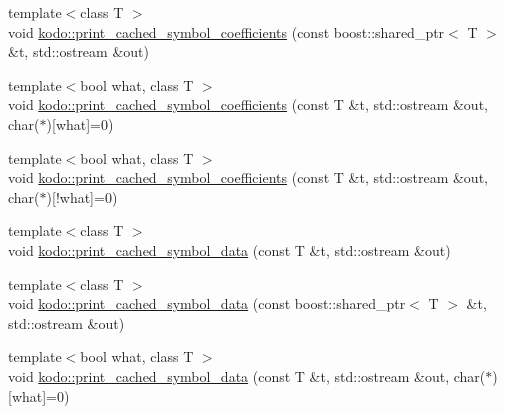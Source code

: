 \begin{DoxyCompactItemize}
\item 
{\footnotesize template$<$class T $>$ }\\void \hyperlink{group__generic__api_ga738799d8f76f36e79fb8cb9ebcef752b}{kodo\-::print\-\_\-cached\-\_\-symbol\-\_\-coefficients} (const boost\-::shared\-\_\-ptr$<$ T $>$ \&t, std\-::ostream \&out)
\begin{DoxyCompactList}\small\item\em \end{DoxyCompactList}\item 
{\footnotesize template$<$bool what, class T $>$ }\\void \hyperlink{group__generic__api_ga1145d50be325131c13fe37d7ab904969}{kodo\-::print\-\_\-cached\-\_\-symbol\-\_\-coefficients} (const T \&t, std\-::ostream \&out, char($\ast$)\mbox{[}what\mbox{]}=0)
\begin{DoxyCompactList}\small\item\em \end{DoxyCompactList}\item 
{\footnotesize template$<$bool what, class T $>$ }\\void \hyperlink{group__generic__api_ga2be16badfbd7d704927588182b7e8d14}{kodo\-::print\-\_\-cached\-\_\-symbol\-\_\-coefficients} (const T \&t, std\-::ostream \&out, char($\ast$)\mbox{[}!what\mbox{]}=0)
\begin{DoxyCompactList}\small\item\em \end{DoxyCompactList}\item 
{\footnotesize template$<$class T $>$ }\\void \hyperlink{group__generic__api_ga080a3e36453ee6c8de96e7af13d4f936}{kodo\-::print\-\_\-cached\-\_\-symbol\-\_\-data} (const T \&t, std\-::ostream \&out)
\item 
{\footnotesize template$<$class T $>$ }\\void \hyperlink{group__generic__api_ga4ff9ca7a1a94d833b26ef306da5a9641}{kodo\-::print\-\_\-cached\-\_\-symbol\-\_\-data} (const boost\-::shared\-\_\-ptr$<$ T $>$ \&t, std\-::ostream \&out)
\begin{DoxyCompactList}\small\item\em \end{DoxyCompactList}\item 
{\footnotesize template$<$bool what, class T $>$ }\\void \hyperlink{group__generic__api_ga5dde22f82c20ea17c098f00c3f5aaa42}{kodo\-::print\-\_\-cached\-\_\-symbol\-\_\-data} (const T \&t, std\-::ostream \&out, char($\ast$)\mbox{[}what\mbox{]}=0)

\end{DoxyCompactItemize}

